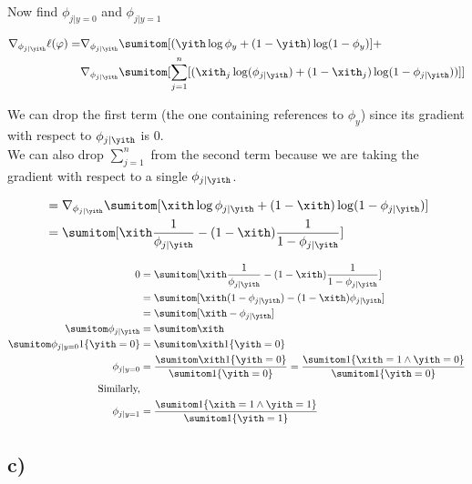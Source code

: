 \documentclass[11pt]{article}
\begin{document}
Now find $\phi_{j|y=0}$ and $\phi_{j|y=1}$

\begin{align*}
    \nabla_{\phi_{j|\yith}} \ell(\varphi) = &\nabla_{\phi_{j|\yith}} \sumitom [ (\yith \log \phi_y + (1 - \yith) \log (1 - \phi_y) ] + \\
                                            &\nabla_{\phi_{j|\yith}} \sumitom [ \sum_{j=1}^n [ ( \xith_j \log(\phi_{j|\yith}) + (1 - \xith_j) \log (1 - \phi_{j|\yith})) ] ] \\
\end{align*}

We can drop the first term (the one containing references to $\phi_y$) since its gradient with respect to $\phi_{j|\yith}$ is 0. \\
We can also drop $\sum_{j=1}^n$ from the second term because we are taking the gradient with respect to a single $\phi_{j|\yith}$.

\begin{align*}
    &= \nabla_{\phi_{j|\yith}} \sumitom [ \xith \log \phi_{j|\yith} + (1 - \xith) \log (1 - \phi_{j|\yith}) ] \\
    &= \sumitom [ \xith \frac{1}{\phi_{j|\yith}} - (1 - \xith) \frac{1}{1 - \phi_{j|\yith}} ] \\
\end{align*}

\begin{align*}
    0                       &= \sumitom [ \xith \frac{1}{\phi_{j|\yith}} - (1 - \xith) \frac{1}{1 - \phi_{j|\yith}} ] \\
                            &= \sumitom [ \xith ( 1 - \phi_{j|\yith}) - (1 - \xith) \phi_{j|\yith} ] \\
                            &= \sumitom [ \xith - \phi_{j|\yith} ] \\
    \sumitom \phi_{j|\yith} &= \sumitom \xith \\
    \sumitom \phi_{j|y=0} 1\{\yith=0\} &= \sumitom \xith 1\{\yith=0\} \\
    \phi_{j|y=0} &= \frac{\sumitom \xith 1\{\yith=0\}}{\sumitom 1\{\yith=0\}} = \frac{\sumitom 1\{\xith=1 \land \yith=0\}}{\sumitom 1\{\yith=0\}} \\
    \text{Similarly,} \\
    \phi_{j|y=1} &= \frac{\sumitom 1\{\xith=1 \land \yith=1\}}{\sumitom 1\{\yith=1\}} \\
\end{align*}

\subsection*{c)}
\end{document}
